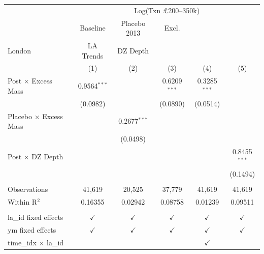 \begingroup
\centering
\begin{tabular}{lccccc}
   \toprule
    & \multicolumn{5}{c}{Log(Txn \pounds200--350k)}\\
                                 & Baseline       & Placebo 2013   & Excl.\\ London   & LA Trends      & DZ Depth \\   
                                 & (1)            & (2)            & (3)              & (4)            & (5)\\  
   \midrule 
   Post $\times$ Excess Mass     & 0.9564$^{***}$ &                & 0.6209$^{***}$   & 0.3285$^{***}$ &   \\   
                                 & (0.0982)       &                & (0.0890)         & (0.0514)       &   \\   
   Placebo $\times$ Excess Mass  &                & 0.2677$^{***}$ &                  &                &   \\   
                                 &                & (0.0498)       &                  &                &   \\   
   Post $\times$ DZ Depth        &                &                &                  &                & 0.8455$^{***}$\\   
                                 &                &                &                  &                & (0.1494)\\   
    \\
   Observations                  & 41,619         & 20,525         & 37,779           & 41,619         & 41,619\\  
   Within R$^2$                  & 0.16355        & 0.02942        & 0.08758          & 0.01239        & 0.09511\\  
    \\
   la\_id fixed effects          & $\checkmark$   & $\checkmark$   & $\checkmark$     & $\checkmark$   & $\checkmark$\\   
   ym fixed effects              & $\checkmark$   & $\checkmark$   & $\checkmark$     & $\checkmark$   & $\checkmark$\\   
   time\_idx $\times $ la\_id    &                &                &                  & $\checkmark$   & \\  
   \bottomrule
\end{tabular}
\par\endgroup
